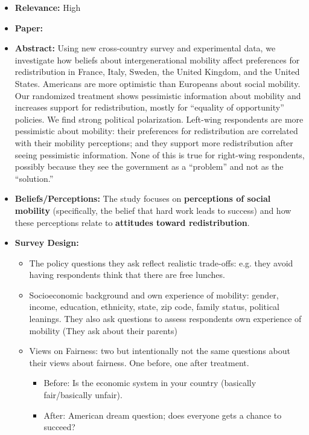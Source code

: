 \documentclass[a4paper, 12pt]{article}
\begin{document}
\begin{itemize}
    \item \textbf{Relevance:} High
    \item \textbf{Paper:} 
    \item \textbf{Abstract:} Using new cross-country survey and experimental data, we investigate how beliefs about intergenerational mobility affect preferences for redistribution in France, Italy, Sweden, the United Kingdom, and the United States. Americans are more optimistic than Europeans about social mobility. Our randomized treatment shows pessimistic information about mobility and increases support for redistribution, mostly for “equality of opportunity” policies. We find strong political polarization. Left-wing respondents are more pessimistic about mobility: their preferences for redistribution are correlated with their mobility perceptions; and they support more redistribution after seeing pessimistic information. None of this is true for right-wing respondents, possibly because they see the government as a “problem” and not as the “solution.”
    \item \textbf{Beliefs/Perceptions:} The study focuses on \textbf{perceptions of social mobility} (specifically, the belief that hard work leads to success) and how these perceptions relate to \textbf{attitudes toward redistribution}.
    \item \textbf{Survey Design:} 
    \begin{itemize}
        \item The policy questions they ask reflect realistic trade-offs: e.g. they avoid having respondents think that there are free lunches.
        \item Socioeconomic background and own experience of mobility: gender, income, education, ethnicity, state, zip code, family status, political leanings. They also ask questions to assess respondents own experience of mobility (They ask about their parents)
        \item Views on Fairness: two but intentionally not the same questions about their views about fairness. One before, one after treatment. 
        \begin{itemize}
            \item Before: Is the economic system in your country (basically fair/basically unfair).
            \item After: American dream question; does everyone gets a chance to succeed?
        \end{itemize}

\end{itemize}
\end{itemize}
\end{document}
